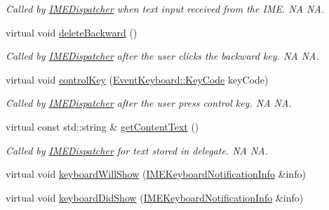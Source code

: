 \begin{DoxyCompactItemize}
\begin{DoxyCompactList}\small\item\em Called by \hyperlink{classIMEDispatcher}{I\+M\+E\+Dispatcher} when text input received from the I\+ME.  NA  NA. \end{DoxyCompactList}\item 
\mbox{\label{classIMEDelegate_ac7df750a229e87f95fde61edeb199813}} 
virtual void \hyperlink{classIMEDelegate_ac7df750a229e87f95fde61edeb199813}{delete\+Backward} ()
\begin{DoxyCompactList}\small\item\em Called by \hyperlink{classIMEDispatcher}{I\+M\+E\+Dispatcher} after the user clicks the backward key.  NA  NA. \end{DoxyCompactList}\item 
\mbox{\label{classIMEDelegate_a8cff05fcff043cdda71117e81da6e454}} 
virtual void \hyperlink{classIMEDelegate_a8cff05fcff043cdda71117e81da6e454}{control\+Key} (\hyperlink{classEventKeyboard_a7cd3fa46515673276ce8ec7f0e051606}{Event\+Keyboard\+::\+Key\+Code} key\+Code)
\begin{DoxyCompactList}\small\item\em Called by \hyperlink{classIMEDispatcher}{I\+M\+E\+Dispatcher} after the user press control key.  NA  NA. \end{DoxyCompactList}\item 
\mbox{\label{classIMEDelegate_afc97a1b9d50cfcfa7cda4a3cf14dfb9c}} 
virtual const std\+::string \& \hyperlink{classIMEDelegate_afc97a1b9d50cfcfa7cda4a3cf14dfb9c}{get\+Content\+Text} ()
\begin{DoxyCompactList}\small\item\em Called by \hyperlink{classIMEDispatcher}{I\+M\+E\+Dispatcher} for text stored in delegate.  NA  NA. \end{DoxyCompactList}\item 
virtual void \hyperlink{classIMEDelegate_ac9f4511548c15f58087d48bcb8cedbfc}{keyboard\+Will\+Show} (\hyperlink{structIMEKeyboardNotificationInfo}{I\+M\+E\+Keyboard\+Notification\+Info} \&info)
\item 
virtual void \hyperlink{classIMEDelegate_a3d55e52ab965ccfdacaed053484785e9}{keyboard\+Did\+Show} (\hyperlink{structIMEKeyboardNotificationInfo}{I\+M\+E\+Keyboard\+Notification\+Info} \&info)
\item 

\end{DoxyCompactItemize}
